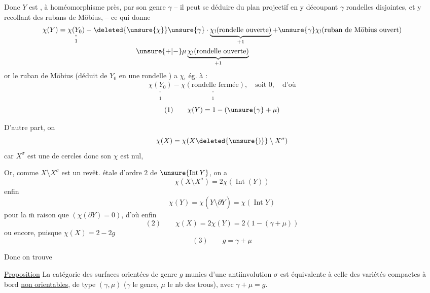
Donc $Y$ est , à homéomorphisme près, par son genre $\gamma$  -- il peut se déduire du plan projectif  en y découpant $\gamma$ rondelles disjointes, et y recollant des rubans de Möbius,  -- ce qui donne
\[
\begin{aligned}
\chi(Y)&=\underset{\substack{\text{''}\\1}}{\chi(Y_0)}
-\deleted{\unsure{\chi}}\unsure{\gamma}\cdot
\underbrace{\chi_!(\text{rondelle ouverte})}_{+1}
+\unsure{\gamma}\chi_!(\text{ruban de Möbius ouvert})\\
&\hspace{11em}\unsure{+|-}\mu\underbrace{\chi_!(\text{rondelle ouverte})}_{+1}
\end{aligned}
\]
or le ruban de Möbius  (déduit de $Y_0$ en  une rondelle ) a  $\chi_!$ ég. à :
\[
\underset{\substack{\text{''}\\1}}{\chi(Y_0)}-
\underset{\substack{\text{''}\\1}}{\chi(\text{rondelle fermée})},
\quad \text{soit }0,\quad \text{d'où}
\]
\[
(1)\qquad \chi(Y)=1-(\unsure{\gamma}+\mu)
\]

D'autre part, on 
\[
\chi(X)=\chi(X\deleted{\unsure{)}}\setminus X^\sigma)
\]
car $X^\sigma$ est une  de cercles donc son $\chi$ est nul,


Or, comme $X\setminus X^\sigma$ est un revêt. étale d'ordre $2$ de $\unsure{\operatorname{Int}Y}$, on a
\[
\chi(X\setminus X^\sigma)=2\chi(\operatorname{Int}(Y))
\]
enfin
\[
\chi(Y)=\chi(\underline{Y\setminus\partial Y})=\chi(\operatorname{Int}Y)
\]
pour la $\overline{\mathrm m}$ raison que  $(\chi(\partial Y)=0)$,
d'où enfin
\[
(2)\qquad \chi(X)=2\chi(Y)=2(1-(\gamma+\mu))
\]
 ou encore, puisque $\chi(X)=2-2g$
\[
(3)\qquad g=\gamma+\mu
\]

Donc on trouve


\uline{Proposition} La catégorie des surfaces orientées  de genre $g$ munies d'une antiinvolution $\sigma$ est équivalente à celle des variétés compactes à bord \uline{non orientables}, de type $(\gamma,\mu)$ ($\gamma$ le genre, $\mu$ le nb des trous), avec $\gamma+\mu=g$.

